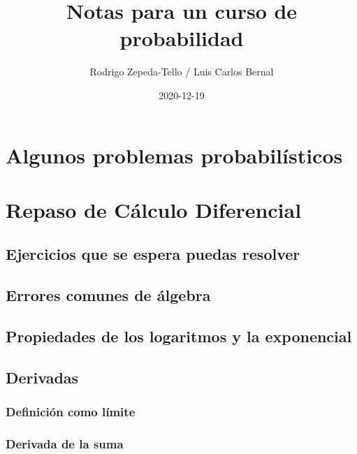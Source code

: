 \documentclass[
]{book}
\title{Notas para un curso de probabilidad}
\author{Rodrigo Zepeda-Tello / Luis Carlos Bernal}
\date{2020-12-19}
\begin{document}
\maketitle

{
\setcounter{tocdepth}{1}
\tableofcontents
}
\hypertarget{algunos-problemas-probabiluxedsticos}{%
\chapter{Algunos problemas probabilísticos}\label{algunos-problemas-probabiluxedsticos}}

\hypertarget{repaso_diferencial}{%
\chapter{Repaso de Cálculo Diferencial}\label{repaso_diferencial}}

\hypertarget{ejercicios-que-se-espera-puedas-resolver}{%
\section{Ejercicios que se espera puedas resolver}\label{ejercicios-que-se-espera-puedas-resolver}}

\hypertarget{errores-comunes-de-uxe1lgebra}{%
\section{Errores comunes de álgebra}\label{errores-comunes-de-uxe1lgebra}}

\hypertarget{propiedades-de-los-logaritmos-y-la-exponencial}{%
\section{Propiedades de los logaritmos y la exponencial}\label{propiedades-de-los-logaritmos-y-la-exponencial}}

\hypertarget{derivadas}{%
\section{Derivadas}\label{derivadas}}

\hypertarget{definiciuxf3n-como-luxedmite}{%
\subsection{Definición como límite}\label{definiciuxf3n-como-luxedmite}}

\hypertarget{derivada-de-la-suma}{%
\subsection{Derivada de la suma}\label{derivada-de-la-suma}}
\end{document}
